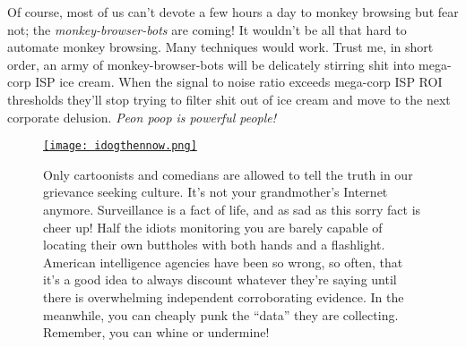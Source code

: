 Of course, most of us can't devote a few hours a day to monkey browsing
but fear not; the \emph{monkey-browser-bots} are coming! It wouldn't be
all that hard to automate monkey browsing. Many techniques would work.
Trust me, in short order, an army of monkey-browser-bots will be
delicately stirring shit into mega-corp ISP ice cream. When the signal
to noise ratio exceeds mega-corp ISP ROI thresholds they'll stop trying
to filter shit out of ice cream and move to the next corporate delusion.
\emph{Peon poop is powerful people!}

\captionsetup[figure]{labelformat=empty}
\begin{figure}[htbp]
\centering
\href{http://www.geekculture.com/joyoftech/joyarchives/1862.html}{\texttt{[image: idogthennow.png]}}
\caption[Only cartoonists and comedians are allowed to tell the truth in our grievance
seeking culture]{Only cartoonists and comedians are allowed to tell the truth in our grievance
seeking culture. It’s not your grandmother’s Internet anymore. Surveillance is a
fact of life, and as sad as this sorry fact is cheer up! Half the idiots monitoring
you are barely capable of locating their own buttholes with both hands and a flashlight.
American intelligence agencies have been so wrong, so often, that it’s a good
idea to always discount whatever they’re saying until there is overwhelming
independent corroborating evidence. In the meanwhile, you can 
cheaply punk the “data” they are collecting. Remember, you can whine or undermine!}
\label{fig:5358X0}
\end{figure}



%